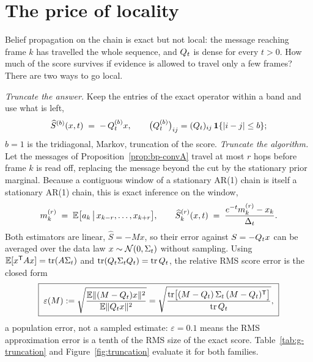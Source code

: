\section{The price of locality}
\label{sec:bp-locality}\label{sec:g-bulk}\label{sec:g-locality}\label{sec:bp-truncation}

Belief propagation on the chain is exact but not local: the message reaching
frame $k$ has travelled the whole sequence, and $Q_t$ is dense for every
$t > 0$. How much of the score survives if evidence is allowed to travel only
a few frames? There are two ways to go local.

\emph{Truncate the answer.} Keep the entries of the exact operator within a
band and use what is left,
\begin{equation}
  \widehat S^{(b)}(x,t) \;=\; -\,Q_t^{(b)} x,
  \qquad
  \big(Q_t^{(b)}\big)_{ij} = (Q_t)_{ij}\,\mathbf{1}\{|i-j| \le b\};
  \label{eq:bp-banded}
\end{equation}
$b = 1$ is the tridiagonal, Markov, truncation of the score.
\emph{Truncate the algorithm.} Let the messages of
Proposition~\ref{prop:bp-convA} travel at most $r$ hops before frame $k$ is
read off, replacing the message beyond the cut by the stationary prior
marginal. Because a contiguous window of a stationary AR(1) chain is itself a
stationary AR(1) chain, this is exact inference on the window,
\begin{equation}
  m^{(r)}_k \;=\; \mathbb{E}\big[a_k \,\big|\, x_{k-r}, \dots, x_{k+r}\big],
  \qquad
  \widehat S^{(r)}_k(x,t) \;=\; \frac{e^{-t} m^{(r)}_k - x_k}{\Delta_t}.
  \label{eq:bp-windowed}
\end{equation}
Both estimators are linear, $\widehat S = -Mx$, so their error against
$S = -Q_t x$ can be averaged over the data law $x \sim \mathcal{N}(0,\Sigma_t)$ without
sampling. Using $\mathbb{E}[x^{\mathsf{T}} A x] = \operatorname{tr}(A\Sigma_t)$ and
$\operatorname{tr}(Q_t\Sigma_tQ_t) = \operatorname{tr}Q_t$, the relative RMS
score error is the closed form
\begin{equation}
  \boxed{\;
  \varepsilon(M)
  :=
  \sqrt{\frac{\mathbb{E}\|(M-Q_t)x\|^2}{\mathbb{E}\|Q_t x\|^2}}
  =
  \sqrt{
    \frac{\operatorname{tr}\!\big[(M-Q_t)\,\Sigma_t\,(M-Q_t)^{\mathsf{T}}\big]}
         {\operatorname{tr}Q_t}
  } ,
  \;}
  \label{eq:bp-relerr}
\end{equation}
a population error, not a sampled estimate: $\varepsilon = 0.1$ means the RMS
approximation error is a tenth of the RMS size of the exact score.
Table~\ref{tab:g-truncation} and Figure~\ref{fig:truncation} evaluate it for
both families.

